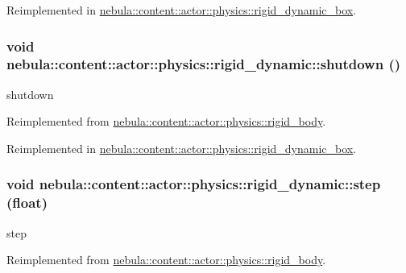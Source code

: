 Reimplemented in \hyperlink{classnebula_1_1content_1_1actor_1_1physics_1_1rigid__dynamic__box_a4125f63982e9dfee274ab2721893bc28}{nebula::content::actor::physics::rigid\_\-dynamic\_\-box}.\hypertarget{classnebula_1_1content_1_1actor_1_1physics_1_1rigid__dynamic_a712d45c781944f79af0d074062674e20}{
\subsubsection[{shutdown}]{\setlength{\rightskip}{0pt plus 5cm}void nebula::content::actor::physics::rigid\_\-dynamic::shutdown ()}}
\label{classnebula_1_1content_1_1actor_1_1physics_1_1rigid__dynamic_a712d45c781944f79af0d074062674e20}


shutdown 

Reimplemented from \hyperlink{classnebula_1_1content_1_1actor_1_1physics_1_1rigid__body_a99b70594f437d666ec7ee33e4d36c964}{nebula::content::actor::physics::rigid\_\-body}.

Reimplemented in \hyperlink{classnebula_1_1content_1_1actor_1_1physics_1_1rigid__dynamic__box_a3f9abbce238ad6bee7363ab9a849512c}{nebula::content::actor::physics::rigid\_\-dynamic\_\-box}.\hypertarget{classnebula_1_1content_1_1actor_1_1physics_1_1rigid__dynamic_a23e957b179440185cfc15750b47f3a5c}{
\subsubsection[{step}]{\setlength{\rightskip}{0pt plus 5cm}void nebula::content::actor::physics::rigid\_\-dynamic::step (float)}}
\label{classnebula_1_1content_1_1actor_1_1physics_1_1rigid__dynamic_a23e957b179440185cfc15750b47f3a5c}


step 

Reimplemented from \hyperlink{classnebula_1_1content_1_1actor_1_1physics_1_1rigid__body_a480452963a16809aef9a8bd80bce1d16}{nebula::content::actor::physics::rigid\_\-body}.


